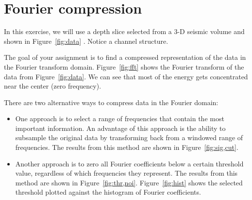 \section{Fourier compression}

In this exercise, we will use a depth slice selected from a 3-D
seismic volume and shown in Figure~\ref{fig:data} \cite[]{hall}. Notice
a channel structure.



The goal of your assignment is to find a compressed representation of
the data in the Fourier transform domain. Figure~\ref{fig:fft} shows
the Fourier transform of the data from Figure~\ref{fig:data}. We can
see that most of the energy gets concentrated near the center (zero
frequency).

There are two alternative ways to compress data in the Fourier domain:
\begin{itemize}
\item One approach is to
select a range of frequencies that contain the most important
information. An advantage of this approach is the ability to subsample
the original data by transforming back from a windowed range of frequencies.
The results from this method are shown in Figure~\ref{fig:sig,cut}.
\item Another approach is to zero all Fourier coefficients below a certain threshold value, regardless of which frequencies they represent.  
 The results from this method are shown in Figure~\ref{fig:thr,noi}. 
Figure~\ref{fig:hist} shows the selected threshold plotted against the histogram of Fourier coefficients.
\end{itemize}



